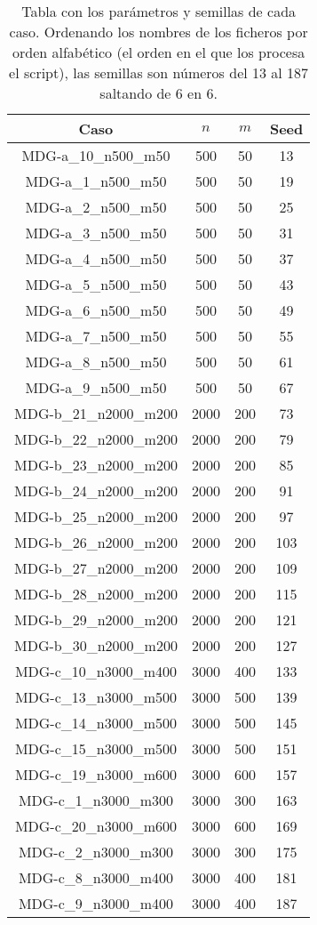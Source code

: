 \documentclass{article}
\begin{document}
\begin{table}[H]
	\centering
	\begin{tabular}{|cccc|}
		\hline
		Caso & $n$ & $m$ & Seed\\ \hline
		MDG-a\_10\_n500\_m50 & 500 & 50 & 13\\
		MDG-a\_1\_n500\_m50 & 500 & 50 & 19\\
		MDG-a\_2\_n500\_m50 & 500 & 50 & 25\\
		MDG-a\_3\_n500\_m50 & 500 & 50 & 31\\
		MDG-a\_4\_n500\_m50 & 500 & 50 & 37\\
		MDG-a\_5\_n500\_m50 & 500 & 50 & 43\\
		MDG-a\_6\_n500\_m50 & 500 & 50 & 49\\
		MDG-a\_7\_n500\_m50 & 500 & 50 & 55\\
		MDG-a\_8\_n500\_m50 & 500 & 50 & 61\\
		MDG-a\_9\_n500\_m50 & 500 & 50 & 67\\
		MDG-b\_21\_n2000\_m200 & 2000 & 200 & 73\\
		MDG-b\_22\_n2000\_m200 & 2000 & 200 & 79\\
		MDG-b\_23\_n2000\_m200 & 2000 & 200 & 85\\
		MDG-b\_24\_n2000\_m200 & 2000 & 200 & 91\\
		MDG-b\_25\_n2000\_m200 & 2000 & 200 & 97\\
		MDG-b\_26\_n2000\_m200 & 2000 & 200 & 103\\
		MDG-b\_27\_n2000\_m200 & 2000 & 200 & 109\\
		MDG-b\_28\_n2000\_m200 & 2000 & 200 & 115\\
		MDG-b\_29\_n2000\_m200 & 2000 & 200 & 121\\
		MDG-b\_30\_n2000\_m200 & 2000 & 200 & 127\\
		MDG-c\_10\_n3000\_m400 & 3000 & 400 & 133\\
		MDG-c\_13\_n3000\_m500 & 3000 & 500 & 139\\
		MDG-c\_14\_n3000\_m500 & 3000 & 500 & 145\\
		MDG-c\_15\_n3000\_m500 & 3000 & 500 & 151\\
		MDG-c\_19\_n3000\_m600 & 3000 & 600 & 157\\
		MDG-c\_1\_n3000\_m300 & 3000 & 300 & 163\\
		MDG-c\_20\_n3000\_m600 & 3000 & 600 & 169\\
		MDG-c\_2\_n3000\_m300 & 3000 & 300 & 175\\
		MDG-c\_8\_n3000\_m400 & 3000 & 400 & 181\\
		MDG-c\_9\_n3000\_m400 & 3000 & 400 & 187\\
		\hline
	\end{tabular}
	\caption{Tabla con los parámetros y semillas de cada caso. Ordenando los nombres de los ficheros por orden alfabético
		(el orden en el que los procesa el script), las semillas son números del 13 al 187 saltando de 6 en 6.}
	\label{tab:param-seed}
\end{table}
\end{document}
